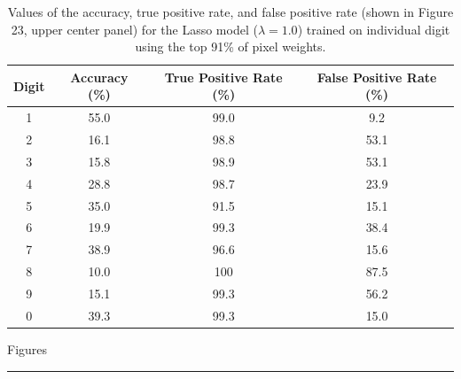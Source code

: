 \documentclass[10pt]{article}
\begin{document}
\begin{table}[ht]
\caption{Values of the accuracy, true positive rate, and false positive rate (shown in Figure 23, upper center panel) for the Lasso model ($\lambda=1.0$) trained on individual digit using the top 91\% of pixel weights.}
\label{table2}
\begin{tabular}{|c|c|c|c|}
\hline
Digit & Accuracy (\%) & True Positive Rate (\%) & False Positive Rate (\%) \\ \hline
1     & 55.0          & 99.0                    & 9.2                      \\ \hline
2     & 16.1          & 98.8                    & 53.1                     \\ \hline
3     & 15.8          & 98.9                    & 53.1                     \\ \hline
4     & 28.8          & 98.7                    & 23.9                     \\ \hline
5     & 35.0          & 91.5                    & 15.1                     \\ \hline
6     & 19.9          & 99.3                    & 38.4                     \\ \hline
7     & 38.9          & 96.6                    & 15.6                     \\ \hline
8     & 10.0          & 100                     & 87.5                     \\ \hline
9     & 15.1          & 99.3                    & 56.2                     \\ \hline
0     & 39.3          & 99.3                    & 15.0                     \\ \hline
\end{tabular}
\end{table}


\newpage
\centerline{\Large{Figures}}
\vskip 10pt
\hrule
\end{document}
